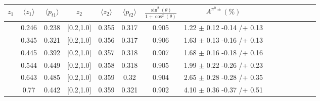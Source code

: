 \begin{table}[H]\scriptsize
\centering
\begin{tabular}{|c| c| c| c| c| c| c| c| c| c|c| c| c| c| c|}
\hline
$z_1$ & $\langle  z_1\rangle$ & $\langle  p_{t1}\rangle$  & $z_2$ & $\langle  z_2 \rangle$ & $\langle  p_{t2}\rangle$ & $\frac{\sin^2(\theta)}{1+\cos^2(\theta)}$& $A^{\pi^0\pm}(\%)$  \\ \hline
[0.2,0.3]	&	0.246	&	0.238	&	[0.2,1.0]	&	0.355	&	0.317	&	0.905	&	1.22	$\pm$	0.12	-0.14	/+	0.13	\\ \hline
[0.3,0.4]	&	0.345	&	0.321	&	[0.2,1.0]	&	0.356	&	0.317	&	0.906	&	1.63	$\pm$	0.13	-0.16	/+	0.13	\\ \hline
[0.4,0.5]	&	0.445	&	0.392	&	[0.2,1.0]	&	0.357	&	0.318	&	0.907	&	1.68	$\pm$	0.16	-0.18	/+	0.16	\\ \hline
[0.5,0.6]	&	0.544	&	0.449	&	[0.2,1.0]	&	0.358	&	0.318	&	0.905	&	1.99	$\pm$	0.22	-0.26	/+	0.23	\\ \hline
[0.6,0.7]	&	0.643	&	0.485	&	[0.2,1.0]	&	0.359	&	0.32	&	0.904	&	2.65	$\pm$	0.28	-0.28	/+	0.35	\\ \hline
[0.7,1.0]	&	0.77	&	0.442	&	[0.2,1.0]	&	0.359	&	0.321	&	0.902	&	4.10	$\pm$	0.36	-0.37	/+	0.51	\\ \hline
																				

\end{tabular}
\end{table}

